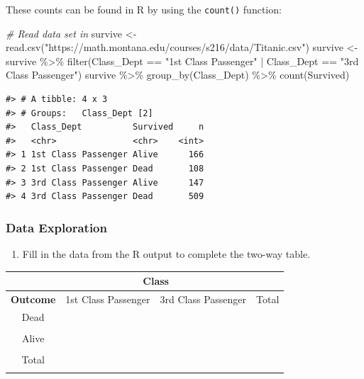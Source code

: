 \documentclass[
]{report}
\newenvironment{Shaded}{\begin{snugshade}}{\end{snugshade}}
\newcommand{\CommentTok}[1]{\textcolor[rgb]{0.56,0.35,0.01}{\textit{#1}}}
\newcommand{\FunctionTok}[1]{\textcolor[rgb]{0.00,0.00,0.00}{#1}}
\newcommand{\NormalTok}[1]{#1}
\newcommand{\OtherTok}[1]{\textcolor[rgb]{0.56,0.35,0.01}{#1}}
\newcommand{\SpecialCharTok}[1]{\textcolor[rgb]{0.00,0.00,0.00}{#1}}
\newcommand{\StringTok}[1]{\textcolor[rgb]{0.31,0.60,0.02}{#1}}
\providecommand{\tightlist}{%
  \setlength{\itemsep}{0pt}\setlength{\parskip}{0pt}}
\begin{document}
These counts can be found in R by using the \texttt{count()} function:

\begin{Shaded}
\begin{Highlighting}[]
\CommentTok{\# Read data set in}
\NormalTok{survive }\OtherTok{\textless{}{-}} \FunctionTok{read.csv}\NormalTok{(}\StringTok{"https://math.montana.edu/courses/s216/data/Titanic.csv"}\NormalTok{)}
\NormalTok{survive }\OtherTok{\textless{}{-}}\NormalTok{ survive }\SpecialCharTok{\%\textgreater{}\%}
  \FunctionTok{filter}\NormalTok{(Class\_Dept }\SpecialCharTok{==} \StringTok{"1st Class Passenger"} \SpecialCharTok{|}\NormalTok{ Class\_Dept }\SpecialCharTok{==} \StringTok{"3rd Class Passenger"}\NormalTok{)}
\NormalTok{survive }\SpecialCharTok{\%\textgreater{}\%} \FunctionTok{group\_by}\NormalTok{(Class\_Dept) }\SpecialCharTok{\%\textgreater{}\%} \FunctionTok{count}\NormalTok{(Survived)}
\end{Highlighting}
\end{Shaded}

\begin{verbatim}
#> # A tibble: 4 x 3
#> # Groups:   Class_Dept [2]
#>   Class_Dept          Survived     n
#>   <chr>               <chr>    <int>
#> 1 1st Class Passenger Alive      166
#> 2 1st Class Passenger Dead       108
#> 3 3rd Class Passenger Alive      147
#> 4 3rd Class Passenger Dead       509
\end{verbatim}

\hypertarget{data-exploration}{%
\subsubsection*{Data Exploration}\label{data-exploration}}

\begin{enumerate}
\def\labelenumi{\arabic{enumi}.}
\setcounter{enumi}{4}
\tightlist
\item
  Fill in the data from the R output to complete the two-way table.
\end{enumerate}

\begin{center}
\begin{tabular}{|c|c|c|c|}
\hline
 & \multicolumn{2}{|c|}{\textbf{Class}} & \\ \hline
\textbf{Outcome} & 1st Class Passenger & 3rd Class Passenger & Total \\ \hline
 Dead & & &  \\ 
 & & & \\ \hline
 Alive & & &  \\ 
 & & & \\ \hline
 Total & & &  \\ 
 & & & \\ \hline  
\end{tabular}
\end{center}
\end{document}
